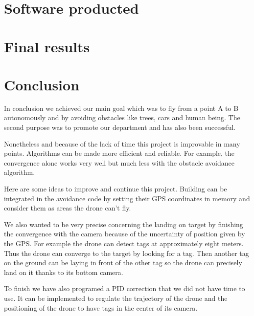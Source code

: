 \documentclass[10pt,a4paper,titlepage]{report}
\begin{document}
\chapter{Software producted}

\chapter{Final results}


\chapter{Conclusion}
In conclusion we achieved our main goal which was to fly from a point A to B autonomously and by avoiding obstacles like trees, cars and human being. The second purpose was to promote our department and has also been successful.

Nonetheless and because of the lack of time this project is improvable in many points. Algorithms can be made more efficient and reliable. For example, the convergence alone works very well but much less with the obstacle avoidance algorithm.

Here are some ideas to improve and continue this project. Building can be integrated in the avoidance code by setting their GPS coordinates in memory and consider them as areas the drone can’t fly.

We also wanted to be very precise concerning the landing on target by finishing the convergence with the camera because of the uncertainty of position given by the GPS. For example the drone can detect tags at approximately eight meters. Thus the drone can converge to the target by looking for a tag. Then another tag on the ground can be laying in front of the other tag so the drone can precisely land on it thanks to its bottom camera.

To finish we have also programed a PID correction that we did not have time to use. It can be implemented to regulate the trajectory of the drone and the positioning of the drone to have tags in the center of its camera.
\end{document}

